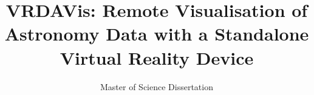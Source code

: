\documentclass[screen, nonacm]{acmart}
\begin{document}
\title{VRDAVis: Remote Visualisation of Astronomy Data with a Standalone Virtual Reality Device}
\subtitle{Master of Science Dissertation}




\maketitle %
\pagestyle{plain}


\newpage

\newpage

\newpage

\newpage

\newpage

\newpage


% 



% 
% 
% 
% 
% 
% 
% 
\end{document}
